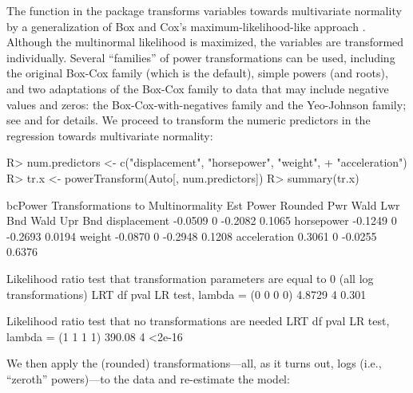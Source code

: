 \documentclass[
]{jss}
\begin{document}
The  function in the  package transforms
variables towards multivariate normality by a generalization of Box and
Cox's maximum-likelihood-like approach \citep{BoxCox:1964}. Although the
multinormal likelihood is maximized, the variables are transformed
individually. Several ``families'' of power transformations can be used,
including the original Box-Cox family (which is the default), simple
powers (and roots), and two adaptations of the Box-Cox family to data
that may include negative values and zeros: the Box-Cox-with-negatives
family and the Yeo-Johnson family; see \citet[Chap.~8]{Weisberg:2014}
and \citet[Chap.~3]{FoxWeisberg:2019} for details. We proceed to
transform the numeric predictors in the  regression towards
multivariate normality:

\begin{CodeChunk}
\begin{CodeInput}
R> num.predictors <- c("displacement", "horsepower", "weight",
+                     "acceleration")
R> tr.x <- powerTransform(Auto[, num.predictors])
R> summary(tr.x)
\end{CodeInput}
\begin{CodeOutput}
bcPower Transformations to Multinormality
             Est Power Rounded Pwr Wald Lwr Bnd Wald Upr Bnd
displacement   -0.0509           0      -0.2082       0.1065
horsepower     -0.1249           0      -0.2693       0.0194
weight         -0.0870           0      -0.2948       0.1208
acceleration    0.3061           0      -0.0255       0.6376

Likelihood ratio test that transformation parameters are equal to 0
 (all log transformations)
                               LRT df  pval
LR test, lambda = (0 0 0 0) 4.8729  4 0.301

Likelihood ratio test that no transformations are needed
                               LRT df   pval
LR test, lambda = (1 1 1 1) 390.08  4 <2e-16
\end{CodeOutput}
\end{CodeChunk}

We then apply the (rounded) transformations---all, as it turns out, logs
(i.e., ``zeroth'' powers)---to the data and re-estimate the model:

\begin{CodeChunk}
\end{CodeChunk}
\end{document}
